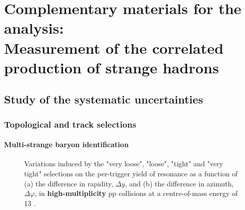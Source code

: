 \chapter{Complementary materials for the analysis:\\Measurement of the correlated production of strange hadrons}
\label{appendix:CorrelatedAnalysis}

\section{Study of the systematic uncertainties}

\subsection{Topological and track selections}

\subsubsection{Multi-strange baryon identification}
\label{subsubsec:AppSystMultiStrangeBaryonIdentification}

\begin{figure}[!p]
\centering
{}
\centering
{}
\caption{Variations induced by the "very loose", "loose", "tight" and "very tight"  \rmXiPM selections on the per-trigger yield of \rmPhiMes resonance as a function of (a) the difference in rapidity, $\Delta y$, and (b) the difference in azimuth, $\Delta \varphi$, in \textbf{high-multiplicity} pp collisions at a centre-of-mass energy of 13 \tev.}
	\label{fig:SystPerTriggerYieldXiRatioHM}
\end{figure}

